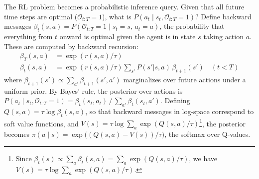The RL problem becomes a probabilistic inference query. Given that all future time steps are optimal ($\mathcal{O}_{t:T} = 1$), what is $P(a_t \mid s_t, \mathcal{O}_{t:T} = 1)$? Define backward messages $\beta_t(s, a) = P(\mathcal{O}_{t:T} = 1 \mid s_t = s,\, a_t = a)$, the probability that everything from $t$ onward is optimal given the agent is in state $s$ taking action $a$. These are computed by backward recursion:
\begin{align}
\beta_T(s, a) &= \exp(r(s, a)/\tau) \label{eq:beta_base} \\
\beta_t(s, a) &= \exp(r(s, a)/\tau) \sum_{s'} P(s'|s,a) \, \beta_{t+1}(s') \quad (t < T) \label{eq:beta_recursion}
\end{align}
where $\beta_{t+1}(s') \propto \sum_{a'} \beta_{t+1}(s', a')$ marginalizes over future actions under a uniform prior. By Bayes' rule, the posterior over actions is $P(a_t \mid s_t, \mathcal{O}_{t:T} = 1) = \beta_t(s_t, a_t) \,/\, \sum_{a'} \beta_t(s_t, a')$. Defining $Q(s,a) = \tau \log \beta_t(s,a)$, so that backward messages in log-space correspond to soft value functions, and $V(s) = \tau \log \sum_a \exp(Q(s,a)/\tau)$\footnote{Since $\beta_t(s) \propto \sum_a \beta_t(s,a) = \sum_a \exp(Q(s,a)/\tau)$, we have $V(s) = \tau \log \sum_a \exp(Q(s,a)/\tau)$.}, the posterior becomes $\pi(a \mid s) = \exp\bigl((Q(s,a) - V(s))/\tau\bigr)$, the softmax over Q-values.

